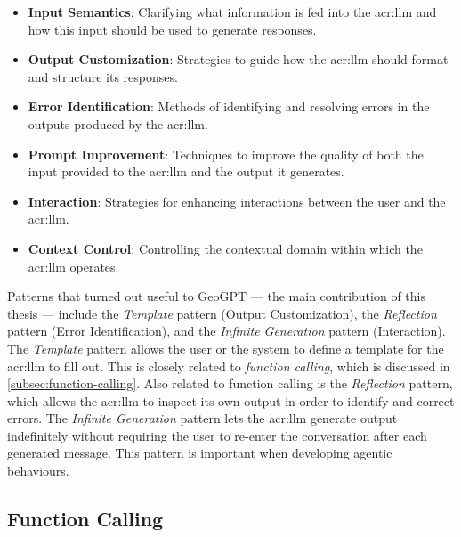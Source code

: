 \begin{itemize}
    \item \textbf{Input Semantics}: Clarifying what information is fed into the \acrshort{acr:llm} and how this input should be used to generate responses.
    \item \textbf{Output Customization}: Strategies to guide how the \acrshort{acr:llm} should format and structure its responses.
    \item \textbf{Error Identification}: Methods of identifying and resolving errors in the outputs produced by the \acrshort{acr:llm}.
    \item \textbf{Prompt Improvement}: Techniques to improve the quality of both the input provided to the \acrshort{acr:llm} and the output it generates.
    \item \textbf{Interaction}: Strategies for enhancing interactions between the user and the \acrshort{acr:llm}.
    \item \textbf{Context Control}: Controlling the contextual domain within which the \acrshort{acr:llm} operates.
\end{itemize}

Patterns that turned out useful to GeoGPT --- the main contribution of this thesis --- include the \textit{Template} pattern (Output Customization), the \textit{Reflection} pattern (Error Identification), and the \textit{Infinite Generation} pattern (Interaction). The \textit{Template} pattern allows the user or the system to define a template for the \acrshort{acr:llm} to fill out. This is closely related to \textit{function calling}, which is discussed in \autoref{subsec:function-calling}. Also related to function calling is the \textit{Reflection} pattern, which allows the \acrshort{acr:llm} to inspect its own output in order to identify and correct errors. The \textit{Infinite Generation} pattern lets the \acrshort{acr:llm} generate output indefinitely without requiring the user to re-enter the conversation after each generated message. This pattern is important when developing agentic behaviours.


\subsection[Function Calling LLMs]{Function Calling }
\label{subsec:function-calling}

